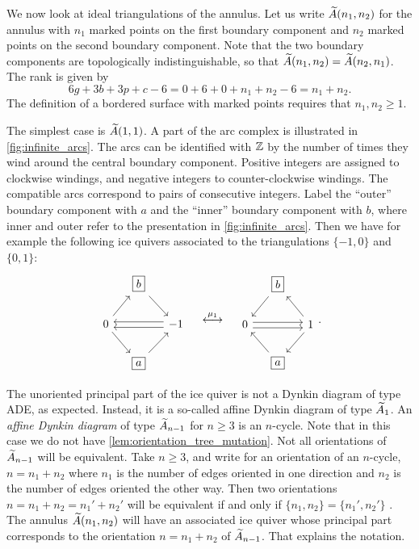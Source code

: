 \begin{example}

	We now look at ideal triangulations of the annulus. Let us write $\widetilde{A}(n_1, n_2)$ for
	the annulus with $n_1$ marked points on the first boundary component and $n_2$ marked
	points on the second boundary component. Note that the two boundary components are
	topologically indistinguishable, so that $\widetilde{A}(n_1, n_2) = \widetilde{A}(n_2, n_1)$. The
	rank is given by
	\begin{equation*}
		6g + 3b + 3p + c - 6 = 0 + 6 + 0 + n_1 + n_2 -6 = n_1 + n_2.
	\end{equation*}
	The definition of a bordered surface with marked points requires that $n_1, n_2 \geq
		1$.

	The simplest case is $\widetilde{A}(1,1)$. A part of the arc complex is illustrated in
	\cref{fig:infinite_arcs}. The arcs can be identified with $\mathbb{Z}$ by the number of times
	they wind around the central boundary component. Positive integers are assigned to
	clockwise windings, and negative integers to counter-clockwise windings. The compatible
	arcs correspond to pairs of consecutive integers. Label the ``outer'' boundary
	component with $a$ and the ``inner'' boundary component with $b$, where inner and outer
	refer to the presentation in \cref{fig:infinite_arcs}. Then we have for example the
	following ice quivers associated to the triangulations $\{-1, 0\}$ and $\{0,1\}$:
	\begin{equation*}
		\begin{tikzcd}[column sep=small]
			& \boxed{b} \drar & \\
			0 \urar \drar && -1 \ar[ll, shift left] \ar[ll, shift right]\\
			& \boxed{a} \urar &
		\end{tikzcd}
		\quad \overset{\mu_1}{\longleftrightarrow} \quad
		\begin{tikzcd}[column sep=small]
			& \boxed{b} \dlar & \\
			0 \ar[rr, shift left] \ar[rr, shift right]  && \dlar \ular 1\\
			& \boxed{a} \ular &
		\end{tikzcd}.
	\end{equation*}

	The unoriented principal part of the ice quiver is not a Dynkin diagram of type ADE, as
	expected. Instead, it is a so-called affine Dynkin diagram of type $\widetilde{A}_1$. An
	\emph{affine Dynkin diagram} of type $\widetilde{A}_{n-1}$ for $n
		\geq 3$ is an $n$-cycle. Note that in this case we do not have
	\cref{lem:orientation_tree_mutation}. Not all orientations of $\widetilde{A}_{n-1}$ will be
	equivalent. Take $n \geq 3$, and write for an orientation of an $n$-cycle, $n = n_1 +
		n_2$ where $n_1$ is the number of edges oriented in one direction and $n_2$ is the
	number of edges oriented the other way. Then two orientations $n = n_1 + n_2 = n_1' +
		n_2'$ will be equivalent if and only if $\{n_1, n_2\} = \{n_1', n_2'\}$ \parencite[Lemma 6.8]{FominShapiroThurston2008CATriangulatedSurfacesI}. The annulus
	$\widetilde{A}(n_1, n_2)$ will have an associated ice quiver whose principal part corresponds
	to the orientation $n = n_1 + n_2$ of $\widetilde{A}_{n - 1}$. That explains the notation.


\end{example}
